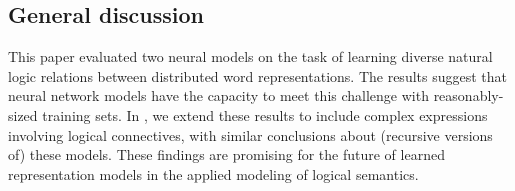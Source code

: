 \subsection*{General discussion}\label{sec:discussion}

This paper evaluated two neural models on the task of learning diverse
natural logic relations between distributed word representations. The
results suggest that neural network models have the capacity to
meet this challenge with reasonably-sized training sets. In
\cite{Bowman:Potts:Manning:2014}, we extend these results to include
complex expressions involving logical connectives, with similar
conclusions about (recursive versions of) these models. These findings
are promising for the future of learned representation models in the
applied modeling of logical semantics.

%
%
%


